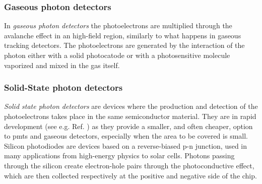 \subsubsection*{Gaseous photon detectors}
In \textit{gaseous photon detectors} the photoelectrons are multiplied through the avalanche effect in an high-field region, similarly to what happens in gaseous tracking detectors. The photoelectrons are generated by the interaction of the photon either with a solid photocatode or with a photosensitive molecule vaporized and mixed in the gas itself. 

\subsubsection*{Solid-State photon detectors}
\textit{Solid state photon detectors} are devices where the production and detection of the photoelectrons takes place in the same semiconductor material. They are in rapid development (see e.g. Ref. \cite{Renker:2009zz}) as they provide a smaller, and often cheaper, option to \glspl{pmt} and gaseous detectors, especially when the area to be covered is small. 
Silicon photodiodes are devices based on a reverse-biased p-n junction, used in many applications from high-energy physics to solar cells. 
Photons passing through the silicon create electron-hole pairs through the photoconductive effect, which are then collected respectively at the positive and negative side of the chip. 



